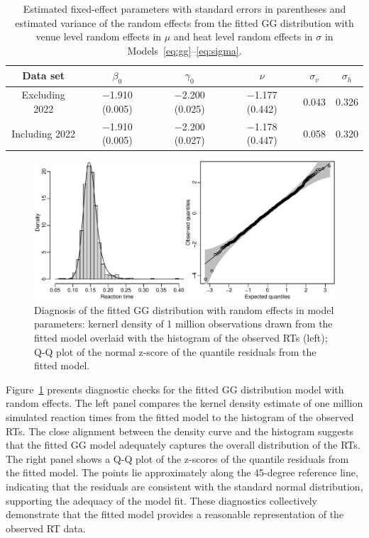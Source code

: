 \documentclass[12pt, letterpaper]{article}
\begin{document}
\begin{table}
  \centering
  \caption{Estimated fixed-effect parameters with standard errors in
    parentheses and estimated variance of the random effects from the
    fitted GG distribution with venue level random
    effects in $\mu$ and heat level random effects in $\sigma$ in
    Models~\eqref{eq:gg}--\eqref{eq:sigma}.}
  \label{tab:ggfit}
  \begin{tabular}{c c c c c c}
    \toprule
    Data set & $\beta_0$ & $\gamma_0$ & $\nu$ & $\sigma_v$ & $\sigma_h$ \\
    \midrule
    Excluding 2022 & $-$1.910 (0.005) & $-$2.200 (0.025) & $-$1.177 (0.442) & 0.043 & 0.326 \\
    Including 2022 & $-$1.910 (0.005) & $-$2.200 (0.027) & $-$1.178 (0.447) & 0.058 & 0.320 \\
    \bottomrule
  \end{tabular}
\end{table}

\begin{figure}[tbp]
  \centering
  \includegraphics[width=\textwidth]{diagnosis.pdf}
  \caption{Diagnosis of the fitted GG distribution with
    random effects in model parameters: kernerl density of 1 million
    observations drawn from the fitted model overlaid with the
    histogram of the observed RTs (left); Q-Q plot of the
    normal z-score of the quantile residuals from the fitted model.}
  \label{fig:diagnosis}
\end{figure}


Figure~\ref{fig:diagnosis} presents diagnostic checks for the fitted
GG distribution model with random effects. The left
panel compares the kernel density estimate of one million simulated reaction
times from the fitted model to the histogram of the observed RTs.
The close alignment between the density curve and the histogram suggests that
the fitted GG model adequately captures the overall distribution of the
RTs. The right panel shows a Q-Q plot of the z-scores of the
quantile residuals from the fitted model. The points lie approximately along
the 45-degree reference line, indicating that the residuals are consistent
with the standard normal distribution, supporting the adequacy of the model
fit. These diagnostics collectively demonstrate that the fitted model provides
a reasonable representation of the observed RT data.
\end{document}
